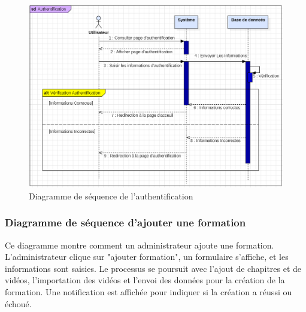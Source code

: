 \begin{figure}[H]
    \centering
    \includegraphics[width=19cm]{Figures/diagrammeDeSequenceAuthentification.png}
    \caption{Diagramme de séquence de l'authentification}
\end{figure}

\subsubsection{Diagramme de séquence d’ajouter une formation}

Ce diagramme montre comment un administrateur ajoute une formation. L'administrateur clique sur "ajouter formation", un formulaire s'affiche, et les informations sont saisies. Le processus se poursuit avec l'ajout de chapitres et de vidéos, l'importation des vidéos et l'envoi des données pour la création de la formation. Une notification est affichée pour indiquer si la création a réussi ou échoué.

